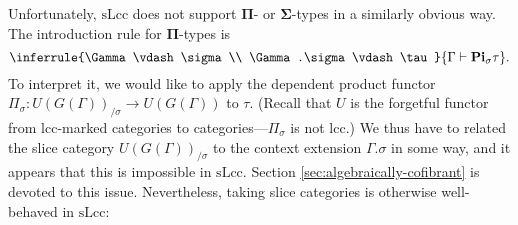 \documentclass[a4paper]{article}
\theoremstyle{remark}
\theoremstyle{definition}
\begin{document}
Unfortunately, $\mathrm{sLcc}$ does not support $\mathbf{\Pi}$- or $\mathbf{\Sigma}$-types in a similarly obvious way.
The introduction rule for $\mathbf{\Pi}$-types is
\begin{equation}
  \inferrule
  {\Gamma \vdash \sigma \\ \Gamma.\sigma \vdash \tau}
  {\Gamma \vdash \mathbf{Pi}_\sigma \tau}.
\end{equation}
To interpret it, we would like to apply the dependent product functor $\Pi_\sigma : U(G(\Gamma))_{/ \sigma} \rightarrow U(G(\Gamma))$ to $\tau$.
(Recall that $U$ is the forgetful functor from lcc-marked categories to categories---$\Pi_\sigma$ is not lcc.)
We thus have to related the slice category $U(G(\Gamma))_{/ \sigma}$ to the context extension $\Gamma.\sigma$ in some way, and it appears that this is impossible in $\mathrm{sLcc}$.
Section \ref{sec:algebraically-cofibrant} is devoted to this issue.
Nevertheless, taking slice categories is otherwise well-behaved in $\mathrm{sLcc}$:
\end{document}
